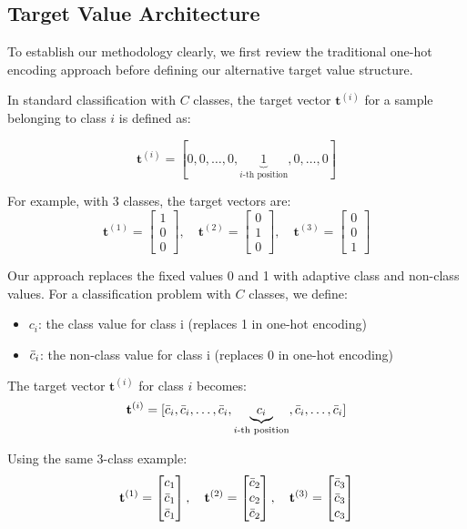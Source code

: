 \documentclass[12pt,fleqn,a4paper]{article}
\begin{document}
\subsection{Target Value Architecture}

To establish our methodology clearly, we first review the traditional one-hot encoding approach before defining our alternative target value structure.


In standard classification with $C$ classes, the target vector $\mathbf{t}^{(i)}$ for a sample belonging to class $i$ is defined as:

$$\mathbf{t}^{(i)} = [0, 0, \ldots, 0, \underbrace{1}_{i\text{-th position}}, 0, \ldots, 0]$$

For example, with 3 classes, the target vectors are:
$$\mathbf{t}^{(1)} = \begin{bmatrix} 1 \\ 0 \\ 0 \end{bmatrix}, \quad 
\mathbf{t}^{(2)} = \begin{bmatrix} 0 \\ 1 \\ 0 \end{bmatrix}, \quad 
\mathbf{t}^{(3)} = \begin{bmatrix} 0 \\ 0 \\ 1 \end{bmatrix}$$


Our approach replaces the fixed values 0 and 1 with adaptive class and non-class values. For a classification problem with $C$ classes, we define:

\begin{itemize}
\item $c_i$: the class value for class i (replaces 1 in one-hot encoding)
\item $\Bar{c}_i$: the non-class value for class i (replaces 0 in one-hot encoding)
\end{itemize}

The target vector $\mathbf{t}^{(i)}$ for class $i$ becomes:
$$\mathbf{t}^{(i)} = [\Bar{c}_i, \Bar{c}_i, \ldots, \Bar{c}_i, \underbrace{c_i}_{i\text{-th position}}, \Bar{c}_i, \ldots, \Bar{c}_i]$$

Using the same 3-class example:
$$\mathbf{t}^{(1)} = \begin{bmatrix} c_1 \\ \Bar{c}_1 \\ \Bar{c}_1 \end{bmatrix}, \quad 
\mathbf{t}^{(2)} = \begin{bmatrix} \Bar{c}_2 \\ c_2 \\ \Bar{c}_2 \end{bmatrix}, \quad 
\mathbf{t}^{(3)} = \begin{bmatrix} \Bar{c}_3 \\ \Bar{c}_3 \\ c_3 \end{bmatrix}$$
\end{document}
